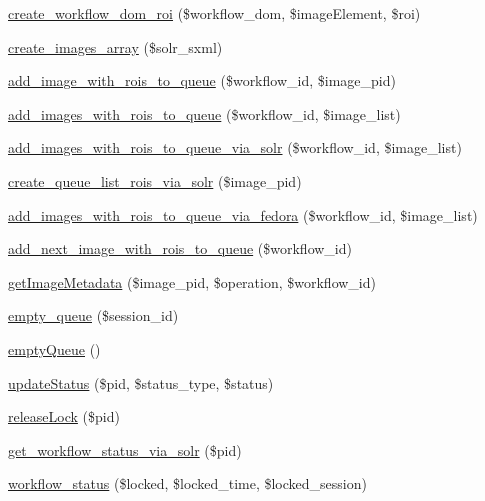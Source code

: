 \begin{DoxyCompactItemize}
\item 
\hyperlink{workspace_8functions_8php_a3f73ed40f7993e373ce17d85824abb83}{create\_\-workflow\_\-dom\_\-roi} (\$workflow\_\-dom, \$imageElement, \$roi)
\item 
\hyperlink{workspace_8functions_8php_adfcd9fab20ef467d28028fde721a99e8}{create\_\-images\_\-array} (\$solr\_\-sxml)
\item 
\hyperlink{workspace_8functions_8php_a024dcf99823d7692f81c247176d8e81c}{add\_\-image\_\-with\_\-rois\_\-to\_\-queue} (\$workflow\_\-id, \$image\_\-pid)
\item 
\hyperlink{workspace_8functions_8php_a4295d0f4ddc3d821000c2f27098995e0}{add\_\-images\_\-with\_\-rois\_\-to\_\-queue} (\$workflow\_\-id, \$image\_\-list)
\item 
\hyperlink{workspace_8functions_8php_a969f4513f3066aa70a74af9590a64f8f}{add\_\-images\_\-with\_\-rois\_\-to\_\-queue\_\-via\_\-solr} (\$workflow\_\-id, \$image\_\-list)
\item 
\hyperlink{workspace_8functions_8php_a92545a3b3fdf140f59288f377fb9e981}{create\_\-queue\_\-list\_\-rois\_\-via\_\-solr} (\$image\_\-pid)
\item 
\hyperlink{workspace_8functions_8php_a9c86489822e487e1438f143b4ebae17f}{add\_\-images\_\-with\_\-rois\_\-to\_\-queue\_\-via\_\-fedora} (\$workflow\_\-id, \$image\_\-list)
\item 
\hyperlink{workspace_8functions_8php_a9c4a73bd57f1024ddeae416b8013e961}{add\_\-next\_\-image\_\-with\_\-rois\_\-to\_\-queue} (\$workflow\_\-id)
\item 
\hyperlink{workspace_8functions_8php_a48e20dce520fdabf3c5e1f6de04d0393}{getImageMetadata} (\$image\_\-pid, \$operation, \$workflow\_\-id)
\item 
\hyperlink{workspace_8functions_8php_a391d88ccd1497a1380618928ab5e8e02}{empty\_\-queue} (\$session\_\-id)
\item 
\hyperlink{workspace_8functions_8php_adc8a7972c0fe59df9ebeb226c30c1fcf}{emptyQueue} ()
\item 
\hyperlink{workspace_8functions_8php_ab698518e69f8e41be92fc0e1576f69f6}{updateStatus} (\$pid, \$status\_\-type, \$status)
\item 
\hyperlink{workspace_8functions_8php_af009f86f57dec896f8c08dbccd931822}{releaseLock} (\$pid)
\item 
\hyperlink{workspace_8functions_8php_ae4bb84838e415581eb08082d9018478e}{get\_\-workflow\_\-status\_\-via\_\-solr} (\$pid)
\item 
\hyperlink{workspace_8functions_8php_a4fd3cbdcf1282bd92e9609b5de35863c}{workflow\_\-status} (\$locked, \$locked\_\-time, \$locked\_\-session)

\end{DoxyCompactItemize}
